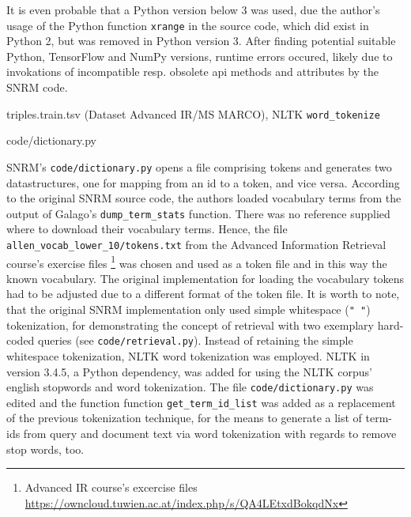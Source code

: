 It is even probable that a Python version below 3 was used, due the author's usage of the Python 
    function \texttt{xrange} in the source code, which did exist in Python 2, but was removed in Python version 3.
After finding potential suitable Python, TensorFlow and NumPy versions, runtime errors occured, likely due to invokations of incompatible 
    resp. obsolete api methods and attributes by the SNRM code.



triples.train.tsv (Dataset Advanced IR/MS MARCO), NLTK \verb|word_tokenize|




code/dictionary.py




SNRM's \texttt{code/dictionary.py} opens a file comprising tokens and generates two datastructures, one for mapping from an id to a token, 
    and vice versa.
According to the original SNRM source code, the authors loaded vocabulary terms from the output of Galago's \verb|dump_term_stats| function.
There was no reference supplied where to download their vocabulary terms.
Hence, the file \verb|allen_vocab_lower_10/tokens.txt| from the Advanced Information Retrieval course's exercise files 
    \footnote{Advanced IR course's excercise files \url{https://owncloud.tuwien.ac.at/index.php/s/QA4LEtxdBokqdNx}}
    was chosen and used as a token file and in this way the known vocabulary.
The original implementation for loading the vocabulary tokens had to be adjusted due to a different format of the token file.
It is worth to note, that the original SNRM implementation only used simple whitespace (\verb|" "|) tokenization, for demonstrating
    the concept of retrieval with two exemplary hard-coded queries (see \texttt{code/retrieval.py}).
Instead of retaining the simple whitespace tokenization, NLTK word tokenization was employed.
NLTK in version 3.4.5, a Python dependency, was added for using the NLTK corpus' english stopwords and word tokenization.
The file \texttt{code/dictionary.py} was edited and the function function \verb|get_term_id_list| was added as a 
    replacement of the previous tokenization technique, for the means to generate a list of term-ids from 
    query and document text via word tokenization with regards to remove stop words, too.







